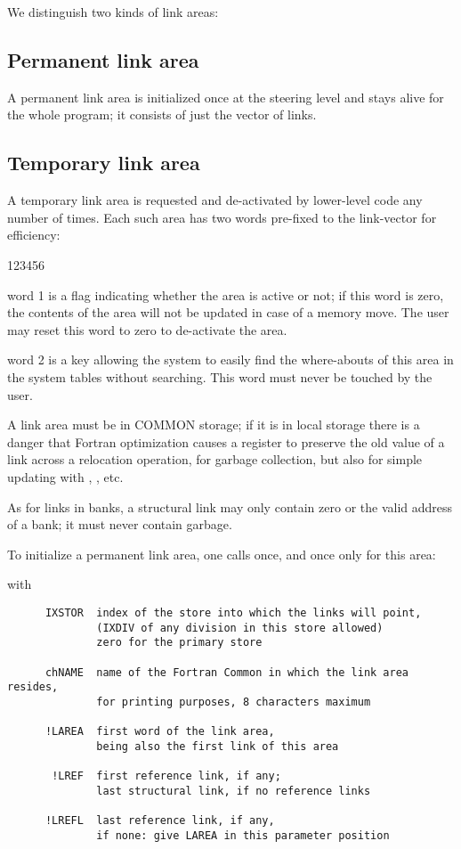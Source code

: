 We distinguish two kinds of link areas:

\subsection*{Permanent link area}

A permanent link area is initialized once at the steering level
and stays alive for the whole program;
it consists of just the vector of links.

\subsection*{Temporary link area}

A temporary link area is requested and de-activated
by lower-level code any number of times.
Each such area has two words pre-fixed to the link-vector
for efficiency:

\begin{DLtt}{123456}
\item[word 1] is a flag indicating whether the area is active or not;
              if this word is zero, the contents of the area will
              not be updated in case of a memory move.
              The user may reset this word to zero to de-activate the area.
\item[word 2] is a key allowing the system to easily find the
              where-abouts of this area in the system tables without searching.
              This word must never be touched by the user.
\end{DLtt}

A link area must be in COMMON storage;
if it is in local storage there is a danger that Fortran
optimization causes a register to preserve the old value of a link
across a relocation operation,
for garbage collection,
but also for simple updating with , , etc.

As for links in banks, a structural link may only contain zero or the
valid address of a bank; it must never contain garbage.

To initialize a permanent link area, one calls once,
and once only for this area:


with
\begin{verbatim}
      IXSTOR  index of the store into which the links will point,
              (IXDIV of any division in this store allowed)
              zero for the primary store

      chNAME  name of the Fortran Common in which the link area resides,
              for printing purposes, 8 characters maximum

      !LAREA  first word of the link area,
              being also the first link of this area

       !LREF  first reference link, if any;
              last structural link, if no reference links

      !LREFL  last reference link, if any,
              if none: give LAREA in this parameter position
\end{verbatim} 

